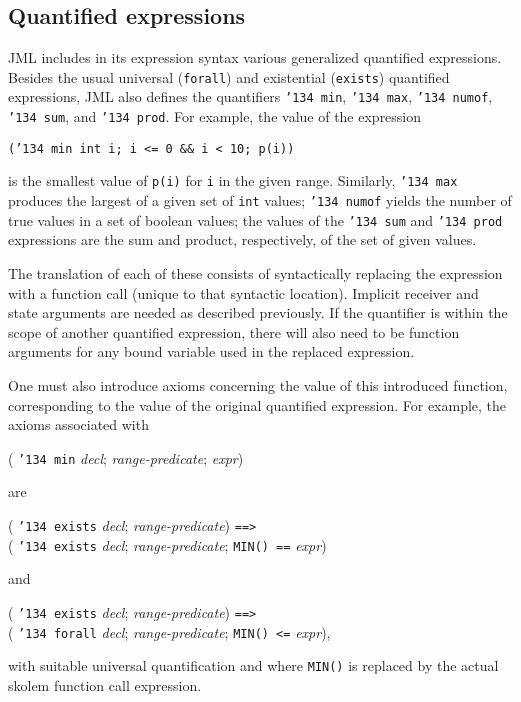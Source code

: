 \documentclass{sig-alternate}
\begin{document}
\subsection{Quantified expressions}

JML includes in its expression syntax various generalized quantified expressions.  Besides
the usual universal (\texttt{forall}) and existential (\texttt{exists}) quantified expressions, JML
also defines the quantifiers \texttt{\char'134 min}, \texttt{\char'134 max}, \texttt{\char'134 numof},
\texttt{\char'134 sum}, and \texttt{\char'134 prod}.  For example, the value of the expression
\begin{center} \texttt{(\char'134 min int i; i <= 0 \&\& i < 10; p(i))} \end{center}
is the smallest value of \texttt{p(i)} for \texttt{i} in the given range.  Similarly, \texttt{\char'134 max}
produces the largest of a given set of \texttt{int} values;  \texttt{\char'134 numof} yields the number
of true values in a set of boolean values; the values of the
 \texttt{\char'134 sum} and \texttt{\char'134 prod}
expressions are the sum and product, respectively, of the set of given values.

The translation of each of these consists of syntactically replacing the expression with a
function call (unique to that syntactic location).  Implicit receiver and state arguments are needed
as described previously.  If the quantifier is within the scope of another quantified
expression, there will also need to be function arguments for any bound variable used
in the replaced expression.

One must also introduce axioms concerning the value of this introduced function, 
corresponding to the value of the original quantified expression.  For example, the
axioms associated with
\begin{center} ( \texttt{\char'134 min} {\em decl}; {\em range-predicate}; {\em expr}) \end{center}
are 
\begin{center} ( \texttt{\char'134 exists} {\em decl}; {\em range-predicate}) \texttt{==>} \\
( \texttt{\char'134 exists} {\em decl}; {\em range-predicate}; \texttt{MIN() ==} {\em expr}) \end{center}
and
\begin{center} ( \texttt{\char'134 exists} {\em decl}; {\em range-predicate}) \texttt{==>} \\
( \texttt{\char'134 forall} {\em decl}; {\em range-predicate}; \texttt{MIN() <=} {\em expr}), \end{center}
with suitable universal quantification and 
where \texttt{MIN()} is replaced by the actual skolem function call expression.
\end{document}
